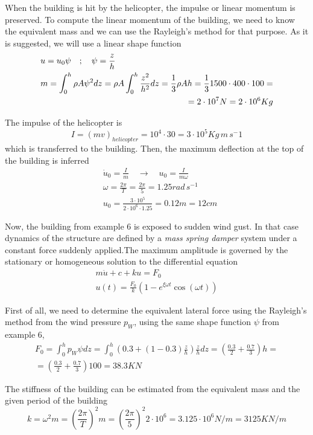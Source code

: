 \documentclass{problems}
\begin{document}
When the building is hit by the helicopter, the impulse or linear momentum is preserved. To compute the linear momentum of the building, we need to know the equivalent mass and we can use the Rayleigh's method for that purpose. As it is suggested, we will use a linear shape function
\begin{align*}
&u = u_0\psi \quad ; \quad \psi = \frac{z}{h} \\
&m = \int_0^h \rho A\psi^2dz = \rho A\int_0^h\frac{z^2}{h^2}dz = \frac{1}{3}\rho Ah = \frac{1}{3} 1500 \cdot 400 \cdot 100 = \\
& \pushright{= 2\cdot 10^7N = 2\cdot 10^6Kg}
\end{align*}

The impulse of the helicopter is
$$
I = (mv)_{helicopter} = 10^4 \cdot 30 = 3\cdot 10^5 Kg\,m\,s^-1
$$
which is transferred to the building. Then, the maximum deflection at the top of the building is inferred
\begin{align*}
&\dot{u}_0 = \frac{I}{m} \quad \rightarrow \quad u_0 = \frac{I}{m\omega} \\
&\omega = \frac{2\pi}{T} = \frac{2\pi}{5} = 1.25rad\,s^{-1} \\
&u_0 = \frac{3\cdot 10^5}{2\cdot 10^6\cdot 1.25} = 0.12m = 12cm
\end{align*}



Now, the building from example 6 is exposed to sudden wind gust. In that case dynamics of the  structure are defined by a \emph{mass spring damper} system under a constant force suddenly applied.The maximum amplitude is governed by the stationary or homogeneous solution to the differential equation
\begin{align*}
m\ddot{u} + c + ku = F_0 \\
u(t) = \frac{F_0}{k}(1 -e^{\xi\omega t}\cos(\omega t))
\end{align*}

First of all, we need to determine the equivalent lateral force using the Rayleigh's method from the wind pressure $p_W$, using the same shape function $\psi$ from example 6,
\begin{align*}
F_0 = \int_0^h p_W\psi dz = \int_0^h \left(0.3 + (1-0.3)\frac{z}{h}\right)\frac{z}{h}dz = \left(\frac{0.3}{2} + \frac{0.7}{3}\right)h = \\
= \left(\frac{0.3}{2} + \frac{0.7}{3}\right)100 = 38.3KN
\end{align*}

The stiffness of the building can be estimated from the equivalent mass and the given period of the building
$$
k = \omega^2m = \left(\frac{2\pi}{T}\right)^2m = \left(\frac{2\pi}{5}\right)^2 2\cdot 10^6 = 3.125\cdot 10^6 N/m = 3125KN/m
$$
\end{document}
